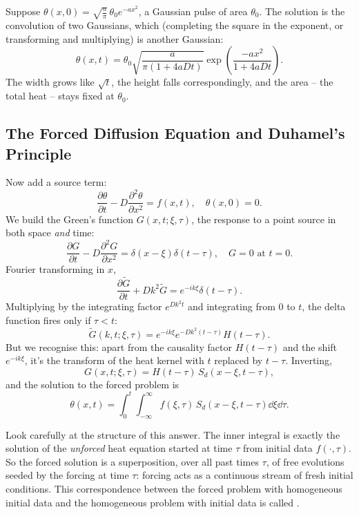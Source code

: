 \begin{example}
    Suppose $\theta(x, 0) = \sqrt{\frac{a}{\pi}}\,\theta_0 e^{-ax^2}$, a Gaussian pulse of area $\theta_0$. The solution is the convolution of two Gaussians, which (completing the square in the exponent, or transforming and multiplying) is another Gaussian:
    $$
    \theta(x, t) = \theta_0\sqrt{\frac{a}{\pi(1 + 4aDt)}} \exp\left(\frac{-a x^2}{1 + 4 a D t}\right).
    $$
    The width grows like $\sqrt{t}$, the height falls correspondingly, and the area -- the total heat -- stays fixed at $\theta_0$.
\end{example}

\subsection{The Forced Diffusion Equation and Duhamel's Principle}

Now add a source term:
$$
\frac{\partial \theta}{\partial t} - D\frac{\partial^2 \theta}{\partial x^2} = f(x, t), \quad \theta(x, 0) = 0.
$$
We build the Green's function $G(x, t; \xi, \tau)$, the response to a point source in both space \emph{and} time:
$$
\frac{\partial G}{\partial t} - D \frac{\partial^2 G}{\partial x^2} = \delta(x - \xi) \delta(t - \tau), \quad G = 0 \text{ at } t = 0.
$$
Fourier transforming in $x$,
$$
\frac{\partial \tilde{G}}{\partial t} + Dk^2 \tilde{G} = e^{-ik\xi} \delta(t - \tau).
$$
Multiplying by the integrating factor $e^{Dk^2 t}$ and integrating from $0$ to $t$, the delta function fires only if $\tau < t$:
$$
\tilde{G}(k, t; \xi, \tau) = e^{-ik \xi} e^{-Dk^2 (t - \tau)} H(t - \tau).
$$
But we recognise this: apart from the causality factor $H(t - \tau)$ and the shift $e^{-ik\xi}$, it's the transform of the heat kernel with $t$ replaced by $t - \tau$. Inverting,
$$
G(x, t; \xi, \tau) = H(t - \tau)\, S_d(x - \xi, t - \tau),
$$
and the solution to the forced problem is
$$
\theta(x, t) = \int_0^{t} \int_{-\infty}^{\infty} f(\xi, \tau)\, S_d(x - \xi, t - \tau) \dd \xi \dd \tau.
$$

Look carefully at the structure of this answer. The inner integral is exactly the solution of the \emph{unforced} heat equation started at time $\tau$ from initial data $f(\cdot, \tau)$. So the forced solution is a superposition, over all past times $\tau$, of free evolutions seeded by the forcing at time $\tau$: forcing acts as a continuous stream of fresh initial conditions. This correspondence between the forced problem with homogeneous initial data and the homogeneous problem with initial data is called .

